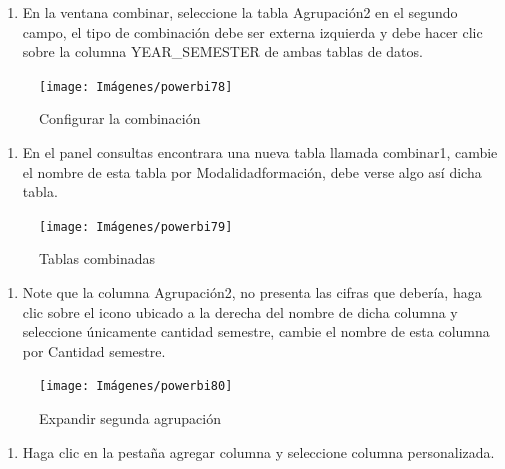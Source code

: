 \documentclass[
]{book}
\providecommand{\tightlist}{%
  \setlength{\itemsep}{0pt}\setlength{\parskip}{0pt}}
\begin{document}
\begin{enumerate}
\def\labelenumi{\arabic{enumi}.}
\setcounter{enumi}{8}
\tightlist
\item
  En la ventana combinar, seleccione la tabla Agrupación2 en el segundo campo, el tipo de combinación debe ser externa izquierda y debe hacer clic sobre la columna YEAR\_SEMESTER de ambas tablas de datos.
\end{enumerate}

\begin{figure}

{\centering \texttt{[image: Imágenes/powerbi78]} 

}

\caption{Configurar la combinación}\label{fig:paso9porcentajes-fig}
\end{figure}

\begin{enumerate}
\def\labelenumi{\arabic{enumi}.}
\setcounter{enumi}{9}
\tightlist
\item
  En el panel consultas encontrara una nueva tabla llamada combinar1, cambie el nombre de esta tabla por Modalidadformación, debe verse algo así dicha tabla.
\end{enumerate}

\begin{figure}

{\centering \texttt{[image: Imágenes/powerbi79]} 

}

\caption{Tablas combinadas}\label{fig:paso10porcentajes-fig}
\end{figure}

\begin{enumerate}
\def\labelenumi{\arabic{enumi}.}
\setcounter{enumi}{10}
\tightlist
\item
  Note que la columna Agrupación2, no presenta las cifras que debería, haga clic sobre el icono ubicado a la derecha del nombre de dicha columna y seleccione únicamente cantidad semestre, cambie el nombre de esta columna por Cantidad semestre.
\end{enumerate}

\begin{figure}

{\centering \texttt{[image: Imágenes/powerbi80]} 

}

\caption{Expandir segunda agrupación}\label{fig:paso11porcentajes-fig}
\end{figure}

\begin{enumerate}
\def\labelenumi{\arabic{enumi}.}
\setcounter{enumi}{11}
\tightlist
\item
  Haga clic en la pestaña agregar columna y seleccione columna personalizada.
\end{enumerate}
\end{document}
